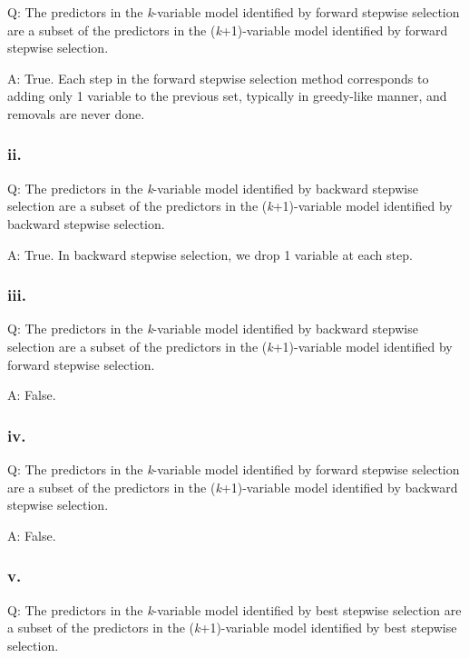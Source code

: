 \documentclass[
]{article}
\begin{document}
Q: The predictors in the \emph{k}-variable model identified by forward
stepwise selection are a subset of the predictors in the
(\emph{k}+1)-variable model identified by forward stepwise selection.

A: True. Each step in the forward stepwise selection method corresponds
to adding only 1 variable to the previous set, typically in greedy-like
manner, and removals are never done.

\hypertarget{ii.-5}{%
\subsubsection{ii.}\label{ii.-5}}

Q: The predictors in the \emph{k}-variable model identified by backward
stepwise selection are a subset of the predictors in the
(\emph{k}+1)-variable model identified by backward stepwise selection.

A: True. In backward stepwise selection, we drop 1 variable at each
step.

\hypertarget{threeciii}{%
\subsubsection{iii.}\label{threeciii}}

Q: The predictors in the \emph{k}-variable model identified by backward
stepwise selection are a subset of the predictors in the
(\emph{k}+1)-variable model identified by forward stepwise selection.

A: False.

\hypertarget{threeciv}{%
\subsubsection{iv.}\label{threeciv}}

Q: The predictors in the \emph{k}-variable model identified by forward
stepwise selection are a subset of the predictors in the
(\emph{k}+1)-variable model identified by backward stepwise selection.

A: False.

\hypertarget{v.}{%
\subsubsection{v.}\label{v.}}

Q: The predictors in the \emph{k}-variable model identified by best
stepwise selection are a subset of the predictors in the
(\emph{k}+1)-variable model identified by best stepwise selection.
\end{document}

